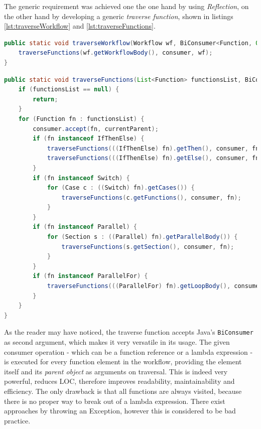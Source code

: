 \documentclass[a4paper,12pt,pdftex,halfparskip,cleardoubleempty,bibtotoc,liststotoc]{scrbook}
\begin{document}
The generic requirement was achieved one the one hand by using \textit{Reflection}, on the other hand by developing a generic \textit{traverse function}, shown in listings \ref{lst:traverseWorkflow} and \ref{lst:traverseFunctions}.

\begin{lstlisting}[language=Java,caption={Traverse workflow},label={lst:traverseWorkflow}]
public static void traverseWorkflow(Workflow wf, BiConsumer<Function, Object> consumer) {
    traverseFunctions(wf.getWorkflowBody(), consumer, wf);
}
\end{lstlisting}

\begin{lstlisting}[language=Java,caption={Traverse functions},label={lst:traverseFunctions}]
public static void traverseFunctions(List<Function> functionsList, BiConsumer<Function, Object> consumer, Object currentParent) {
    if (functionsList == null) {
        return;
    }
    for (Function fn : functionsList) {
        consumer.accept(fn, currentParent);
        if (fn instanceof IfThenElse) {
            traverseFunctions(((IfThenElse) fn).getThen(), consumer, fn);
            traverseFunctions(((IfThenElse) fn).getElse(), consumer, fn);
        }
        if (fn instanceof Switch) {
            for (Case c : ((Switch) fn).getCases()) {
                traverseFunctions(c.getFunctions(), consumer, fn);
            }
        }
        if (fn instanceof Parallel) {
            for (Section s : ((Parallel) fn).getParallelBody()) {
                traverseFunctions(s.getSection(), consumer, fn);
            }
        }
        if (fn instanceof ParallelFor) {
            traverseFunctions(((ParallelFor) fn).getLoopBody(), consumer, fn);
        }
    }
}
\end{lstlisting}

As the reader may have noticed, the traverse function accepts Java's \texttt{BiConsumer} as second argument, which makes it very versatile in its usage. The given consumer operation - which can be a function reference or a lambda expression - is executed for every function element in the workflow, providing the element itself and its \textit{parent object} as arguments on traversal. This is indeed very powerful, reduces LOC, therefore improves readability, maintainability and efficiency. The only drawback is that all functions are always visited, because there is no proper way to break out of a lambda expression. There exist approaches by throwing an Exception, however this is considered to be bad practice.
\end{document}
